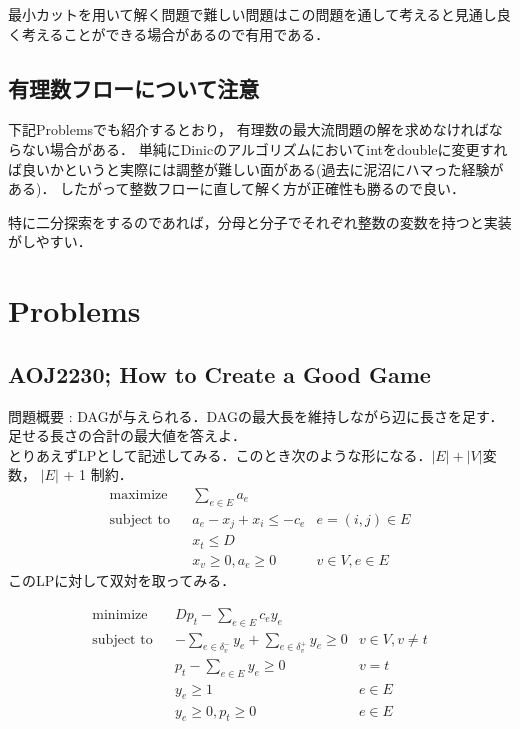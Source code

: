 \documentclass[13pt, a4paper, landscape]{jarticle}
\theoremstyle{nonitalic} %
\begin{document}
最小カットを用いて解く問題で難しい問題はこの問題を通して考えると見通し良く考えることができる場合があるので有用である．



\subsection{有理数フローについて注意}

下記Problemsでも紹介するとおり， 有理数の最大流問題の解を求めなければならない場合がある． 単純にDinicのアルゴリズムにおいてintをdoubleに変更すれば良いかというと実際には調整が難しい面がある(過去に泥沼にハマった経験がある)． したがって整数フローに直して解く方が正確性も勝るので良い．

特に二分探索をするのであれば，分母と分子でそれぞれ整数の変数を持つと実装がしやすい．



\section{Problems}

\subsection{AOJ2230; How to Create a Good Game}

問題概要 : DAGが与えられる．DAGの最大長を維持しながら辺に長さを足す．足せる長さの合計の最大値を答えよ．\\

とりあえずLPとして記述してみる．このとき次のような形になる．$|E|+|V|$変数， $|E|$ + 1 制約．
\begin{align}
 &&&&&\textrm{maximize}   && \sum_{e \in E} a_e \\
 &&&&&\textrm{subject to} && a_e - x_j + x_i \leq - c_e & e = (i,j) \in E  &&&&&\\
 &&&&&                    && x_t \leq  D &&&&&& \\
 &&&&&                    && x_v \geq 0, a_e \geq 0 & v \in V, e \in E &&&&&
\end{align}
このLPに対して双対を取ってみる．

\begin{align}
  &&&&& \textrm{minimize}   && Dp_t - \sum_{e \in E} c_e y_e \\
  &&&&& \textrm{subject to} && -\sum_{e \in \delta_v^- } y_e + \sum_{e \in \delta_v^+ } y_e \geq 0 & v \in V, v\neq t &&&&&\\
  &&&&&                     && p_t - \sum_{e \in E} y_e \geq 0 & v=t \\
  &&&&&                     && y_e \geq 1  & e \in E\\
  &&&&&                     && y_e \geq 0, p_t \geq 0 & e\in E
\end{align}
\end{document}
